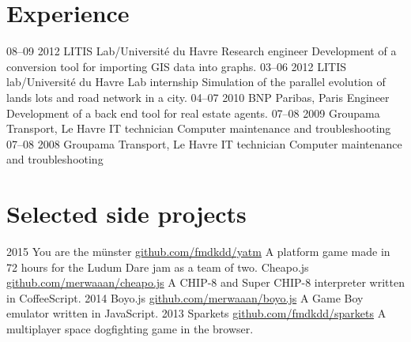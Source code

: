 \documentclass[]{friggeri-cv}
\begin{document}
\section{Experience}

\begin{entrylist}
  \entry
    {08–09 2012}
    {LITIS Lab/Université du Havre}
    {Research engineer}
    {Development of a conversion tool for importing GIS data into graphs.}
  \entry
    {03–06 2012}
    {LITIS lab/Université du Havre}
    {Lab internship}
    {Simulation of the parallel evolution of lands lots and road network in a city.}
  \entry
    {04–07 2010}
    {BNP Paribas, Paris}
    {Engineer}
    {Development of a back end tool for real estate agents.}
  \entry
    {07–08 2009}
    {Groupama Transport, Le Havre}
    {IT technician}
    {Computer maintenance and troubleshooting}
  \entry
    {07–08 2008}
    {Groupama Transport, Le Havre}
    {IT technician}
    {Computer maintenance and troubleshooting}
\end{entrylist}

\section{Selected side projects}

\begin{entrylist}
  \entry
    {2015}
    {You are the münster}
    {\href{http://github.com/fmdkdd/yatm}{github.com/fmdkdd/yatm}}
    {A platform game made in 72 hours for the Ludum Dare jam as a team of two.}
  \entry
    {}
    {Cheapo.js}
    {\href{http://github.com/merwaaan/cheapo.js}{github.com/merwaaan/cheapo.js}}
    {A CHIP-8 and Super CHIP-8 interpreter written in CoffeeScript.}
  \entry
    {2014}
    {Boyo.js}
    {\href{http://github.com/merwaaan/boyo.js}{github.com/merwaaan/boyo.js}}
    {A Game Boy emulator written in JavaScript.}
  \entry
    {2013}
    {Sparkets}
    {\href{http://github.com/fmdkdd/sparkets}{github.com/fmdkdd/sparkets}}
    {A multiplayer space dogfighting game in the browser.}
\end{entrylist}
\end{document}
